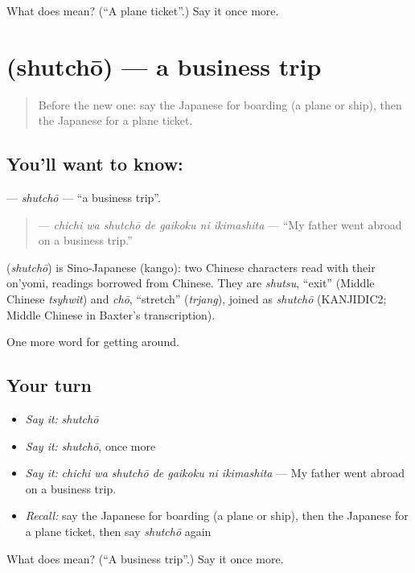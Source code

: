 \begin{tcolorbox}[breakable,colback=teal!4,colframe=teal!35!black,title={Before you move on}]
What does  mean? (\textquotedblleft{}A plane ticket\textquotedblright{}.) Say it once more.
\end{tcolorbox}
\section[\texorpdfstring{\ja{しゅっちょう} (shutchō)}{しゅっちょう (shutchō)}]{ (shutchō) — a business trip}

\label{lesson:JA-C387-shutchou}



\begin{quote}
Before the new one: say the Japanese for boarding (a plane or ship), then the Japanese for a plane ticket.
\end{quote}

\subsection*{You'll want to know: }
\textbf{} — \emph{shutchō} — \textquotedblleft{}a business trip\textquotedblright{}.

\begin{quote}
\textbf{   } — \emph{chichi wa shutchō de gaikoku ni ikimashita} — \textquotedblleft{}My father went abroad on a business trip.\textquotedblright{}
\end{quote}

\begin{cousinweb}
\textbf{} (\emph{shutchō}) is Sino-Japanese (kango): two Chinese characters read with their on'yomi, readings borrowed from Chinese. They are \emph{shutsu}, \textquotedblleft{}exit\textquotedblright{} (Middle Chinese \emph{tsyhwit}) and \emph{chō}, \textquotedblleft{}stretch\textquotedblright{} (\emph{trjang}), joined as \emph{shutchō} (KANJIDIC2; Middle Chinese in Baxter's transcription).
\end{cousinweb}

\begin{grammarlens}[title={What you've built}]
One more word for getting around.
\end{grammarlens}

\subsection*{Your turn}
\begin{itemize}
\raggedright
  \item \emph{Say it:} \emph{shutchō}
  \item \emph{Say it:} \emph{shutchō}, once more
  \item \emph{Say it:} \emph{chichi wa shutchō de gaikoku ni ikimashita} — My father went abroad on a business trip.
  \item \emph{Recall:} say the Japanese for boarding (a plane or ship), then the Japanese for a plane ticket, then say \emph{shutchō} again
\end{itemize}

\begin{tcolorbox}[breakable,colback=teal!4,colframe=teal!35!black,title={Before you move on}]
What does  mean? (\textquotedblleft{}A business trip\textquotedblright{}.) Say it once more.
\end{tcolorbox}
